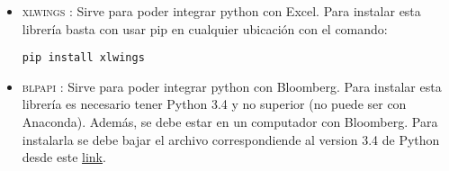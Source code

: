 \documentclass{article}
\begin{document}
\begin{itemize}
\item \textsc{xlwings} : Sirve para poder integrar python con Excel. Para instalar esta librería basta con usar pip en cualquier ubicación con el comando:
\begin{center}
\texttt{pip install xlwings}
\end{center}

\item \textsc{blpapi} : Sirve para poder integrar python con Bloomberg. Para instalar esta librería es necesario tener Python 3.4 y no superior (no puede ser con Anaconda). Además, se debe estar en un computador con Bloomberg. Para instalarla se debe bajar el archivo correspondiende al version 3.4 de Python desde este \href{http://www.bloomberglabs.com/api/libraries/}{link}.



\end{itemize}
\end{document}
